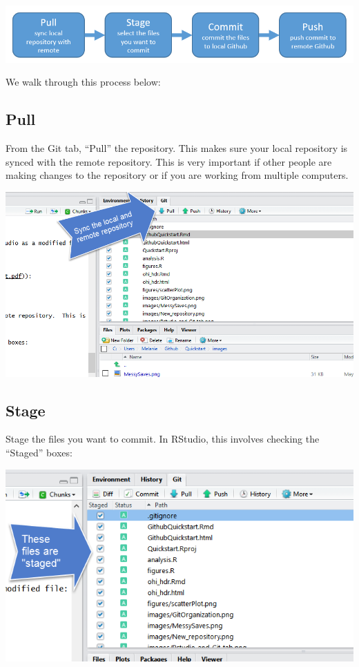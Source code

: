 \documentclass[]{book}
\begin{document}
\includegraphics{img/commit_overview.png}

We walk through this process below:

\hypertarget{pull}{%
\subsection{Pull}\label{pull}}

From the Git tab, ``Pull'' the repository. This makes sure your local repository is synced with the remote repository. This is very important if other people are making changes to the repository or if you are working from multiple computers.

\includegraphics{img/pull.png}

\hypertarget{stage}{%
\subsection{Stage}\label{stage}}

Stage the files you want to commit. In RStudio, this involves checking the ``Staged'' boxes:

\includegraphics{img/staged.png}
\end{document}
